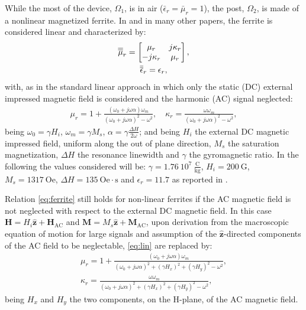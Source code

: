 While the most of the device, $\Omega_1$, is in air ($\bar{\epsilon}_r = \bar{\mu}_r = 1$), the post, $\Omega_2$, is made of a nonlinear magnetized ferrite. In \cite{koshiba1986finite} and in many other papers, the ferrite is considered linear and characterized by: 
\begin{gather}
\label{eq:ferrite}
\overline{\overline{\mu}}_r = 
\begin{bmatrix}
\mu_r& j\kappa_r\\
-j\kappa_r& \mu_r
\end{bmatrix},\\
\overline{\overline{\epsilon}}_r = \epsilon_r,
\end{gather}
%
\noindent with, as in the standard linear approach in which only the static (DC) external impressed magnetic field is considered and the harmonic (AC) signal neglected:
\begin{gather}
\label{eq:lin}
\mu_r = 1 + \frac{(\omega_0 + j\omega\alpha)\omega_m}{(\omega_0 + j\omega\alpha)^2-\omega^2}, \quad
\kappa_r = \frac{\omega\omega_m}{(\omega_0 + j\omega\alpha)^2-\omega^2},
\end{gather}
%
\noindent being $\omega_0 = \gamma H_i$, $\omega_m = \gamma M_s$, $\alpha = \gamma \frac{\Delta H}{2\omega}$; and being $H_i$ the external DC magnetic impressed field, uniform along the out of plane direction, $M_s$ the saturation magnetization,  $\Delta H$ the resonance linewidth and $\gamma$ the gyromagnetic ratio. In the following the values considered will be: $\gamma = 1.76~10^{7}~ \frac{\mathrm{C}}{\mathrm{kg}}$, $H_i = 200~\mathrm{G}$, $M_s = 1317~\mathrm{Oe}$, $\Delta H = 135~\mathrm{Oe \cdot s}$ and $\epsilon_r = 11.7$ as reported in \cite{koshiba1986finite}.

Relation \eqref{eq:ferrite} still holds for non-linear ferrites if the AC magnetic field is not neglected with respect to the external DC magnetic field. In this case $\mathbf{H} = H_i \hat{\mathbf{z}} + \mathbf{H}_\mathrm{AC}$ and $\mathbf{M} = M_s \hat{\mathbf{z}} + \mathbf{M}_\mathrm{AC}$, upon derivation from the macroscopic equation of motion for large signals and assumption of the $\hat{\mathbf{z}}$-directed components of the AC field to be neglectable, \eqref{eq:lin} are replaced by:
%
\begin{gather}
\label{eq:nl1}
\mu_r = 1 + \frac{(\omega_0 + j\omega\alpha)\omega_m}{(\omega_0 + j\omega\alpha)^2 + (\gamma H_x)^2+ (\gamma H_y)^2 -\omega^2}, \\
\label{eq:nl2}
\kappa_r = \frac{\omega\omega_m}{(\omega_0 + j\omega\alpha)^2 + (\gamma H_x)^2+ (\gamma H_y)^2-\omega^2},
\end{gather}
%
\noindent being $H_x$ and $H_y$ the two components, on the H-plane, of the AC magnetic field.


